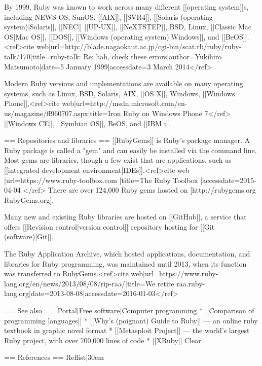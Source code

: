 By 1999, Ruby was known to work across many different [[operating system]]s, including NEWS-OS, SunOS, [[AIX]], [[SVR4]], [[Solaris (operating system)|Solaris]], [[NEC]] [[UP-UX]], [[NeXTSTEP]], BSD, Linux, [[Classic Mac OS|Mac OS]], [[DOS]], [[Windows (operating system)|Windows]], and [[BeOS]].<ref>{{cite web|url=http://blade.nagaokaut.ac.jp/cgi-bin/scat.rb/ruby/ruby-talk/170|title=ruby-talk: Re: hah, check these errors|author=Yukihiro Matsumoto|date=5 January 1999|accessdate=3 March 2014}}</ref>

Modern Ruby versions and implementations are available on many operating systems, such as Linux, BSD, Solaris, AIX, [[OS X]], Windows, [[Windows Phone]],<ref>{{cite web|url=http://msdn.microsoft.com/en-us/magazine/ff960707.aspx|title=Iron Ruby on Windows Phone 7}}</ref> [[Windows CE]], [[Symbian OS]], BeOS, and [[IBM i]].

== Repositories and libraries ==
[[RubyGems]] is Ruby's package manager. A Ruby package is called a "gem" and can easily be installed via the command line. Most gems are libraries, though a few exist that are applications, such as [[integrated development environment|IDEs]].<ref>{{cite web |url=https://www.ruby-toolbox.com |title=The Ruby Toolbox |accessdate=2015-04-04 }}</ref> There are over 124,000 Ruby gems hosted on [http://rubygems.org RubyGems.org].

Many new and existing Ruby libraries are hosted on [[GitHub]], a service that offers [[Revision control|version control]] repository hosting for [[Git (software)|Git]].

The Ruby Application Archive, which hosted applications, documentation, and libraries for Ruby programming, was maintained until 2013, when its function was transferred to RubyGems.<ref>{{cite web|url=https://www.ruby-lang.org/en/news/2013/08/08/rip-raa/|title=We retire raa.ruby-lang.org|date=2013-08-08|accessdate=2016-01-03}}</ref>

== See also ==
{{Portal|Free software|Computer programming}}
* [[Comparison of programming languages]]
* [[Why's (poignant) Guide to Ruby]] — an online ruby textbook in graphic novel format
* [[Metasploit Project]] — the world's largest Ruby project, with over 700,000 lines of code
* [[XRuby]]
{{Clear}}

== References ==
{{Reflist|30em}}

